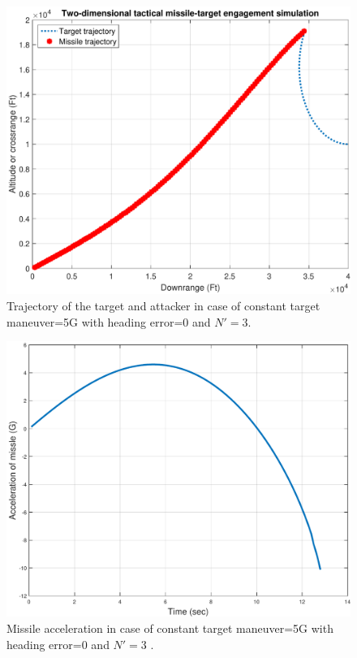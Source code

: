 \begin{figure}[htb]
	\centering
	\includegraphics[scale = 0.75]{fig/trajectoryXNT5HE0N3.pdf}
	\caption{Trajectory of the target and attacker in case of constant target maneuver=5G with heading error=0 and $N'=3$.}
	\label{trajectory0NN3}
\end{figure}


\begin{figure}[htb]
	\centering
	\includegraphics[scale = 0.65]{fig/MissileAccelerationXNT5HE0N3.pdf}
	\caption{Missile acceleration in case of constant target maneuver=5G with heading error=0 and $N'=3$ .}
	\label{missile acceleration0NN3}
\end{figure}

